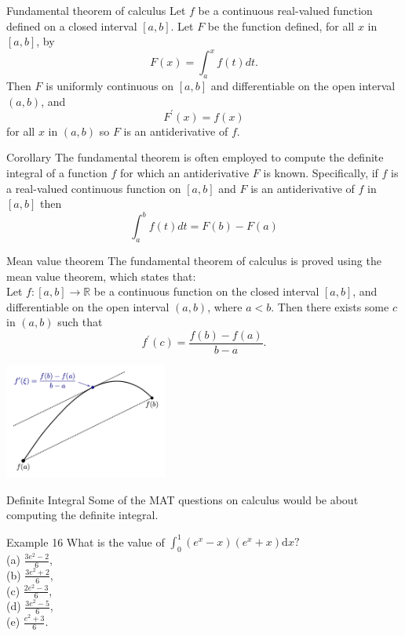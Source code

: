 \documentclass{beamer}
\begin{document}
\begin{frame}{Fundamental theorem of calculus}
    Let $f$ be a continuous real-valued function defined on a closed interval $[a, b]$. Let $F$ be the function defined, for all $x$ in $[a, b]$, by
$$
F(x)=\int_a^x f(t) d t .
$$
Then $F$ is uniformly continuous on $[a, b]$ and differentiable on the open interval $(a, b)$, and
$$
F^{\prime}(x)=f(x)
$$
for all $x$ in $(a, b)$ so $F$ is an antiderivative of $f$.
\end{frame}

\begin{frame}{Corollary}
The fundamental theorem is often employed to compute the definite integral of a function $f$ for which an antiderivative $F$ is known. Specifically, if $f$ is a real-valued continuous function on $[a, b]$ and $F$ is an antiderivative of $f$ in $[a, b]$ then
$$
\int_a^b f(t) d t=F(b)-F(a)
$$
\end{frame}

\begin{frame}{Mean value theorem}
    The fundamental theorem of calculus is proved using the mean value theorem, which states that:\\
    Let $f:[a, b] \rightarrow \mathbb{R}$ be a continuous function on the closed interval $[a, b]$, and differentiable on the open interval $(a, b)$, where $a<b$. Then there exists some $c$ in $(a, b)$ such that
$$
f^{\prime}(c)=\frac{f(b)-f(a)}{b-a} .
$$
\begin{center}
 \includegraphics[width=0.4\textwidth]{Example/assets/2.png}   
\end{center}
\end{frame}

\begin{frame}{Definite Integral}
    Some of the MAT questions on calculus would be about computing the definite integral.
\end{frame}

\begin{frame}{Example 16}
What is the value of $\int_0^1\left(e^x-x\right)\left(e^x+x\right) \mathrm{d} x ?$\\
(a) $\frac{3 e^2-2}{6}$,\\
(b) $\frac{3 e^2+2}{6}$,\\
(c) $\frac{2 e^2-3}{6}$,\\
(d) $\frac{3 e^2-5}{6}$,\\
(e) $\frac{e^2+3}{6}$.
\end{frame}
\end{document}
